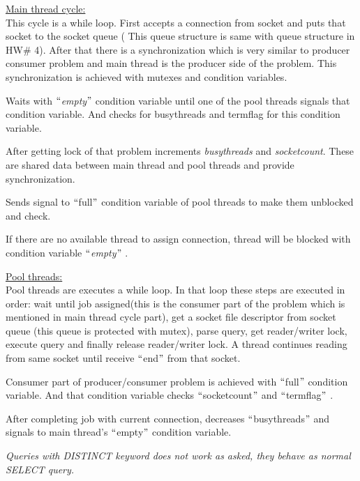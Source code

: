 \documentclass[12pt]{report}
\renewcommand{\_}{\kern-1.5pt\textunderscore\kern-1.5pt}
\begin{document}
\vspace{\baselineskip}
\begin{FlushLeft}
\uline{Main thread cycle:}\\
This cycle is a while loop. First accepts a connection from socket and puts that socket to the socket queue ( This queue structure is same with queue structure in HW$\#$ 4). After that there is a synchronization which is very similar to producer consumer problem and main thread is the producer side of the problem. This synchronization is achieved with mutexes and condition variables. 
\end{FlushLeft}
\begin{FlushLeft}
Waits with $``$\textit{empty$"$  }condition variable until one of the pool threads signals that condition variable. And checks for busythreads and term\_flag for this condition variable.
\end{FlushLeft}
\begin{FlushLeft}
After getting lock of that problem increments \textit{busythreads }and \textit{socketcount}. These are shared data between main thread and pool threads and provide synchronization.
\end{FlushLeft}
\begin{FlushLeft}
Sends signal to $``$full$"$  condition variable of pool threads to make them unblocked and check.
\end{FlushLeft}
\begin{FlushLeft}
If there are no available thread to assign connection, thread will be blocked with condition variable $``$\textit{empty$"$ }.
\end{FlushLeft}

\vspace{\baselineskip}
\begin{FlushLeft}
\uline{Pool threads:}\\
Pool threads are executes a while loop. In that loop these steps are executed in order: wait until job assigned(this is the consumer part of the problem which is mentioned in main thread cycle part), get a socket file descriptor from socket queue (this queue is protected with mutex), parse query, get reader/writer lock, execute query and finally release reader/writer lock. A thread continues reading from same socket until receive $``$end$"$  from that socket.
\end{FlushLeft}
\begin{FlushLeft}
Consumer part of producer/consumer problem is achieved with $``$full$"$  condition variable. And that condition variable checks $``$socketcount$"$  and $``$term\_flag$"$ .
\end{FlushLeft}
\begin{FlushLeft}
After completing job with current connection, decreases $``$busythreads$"$  and signals to main thread’s $``$empty$"$  condition variable.
\end{FlushLeft}
\begin{FlushLeft}
\textit{Queries with DISTINCT keyword does not work as asked, they behave as normal SELECT query.}
\end{FlushLeft}
\end{document}
